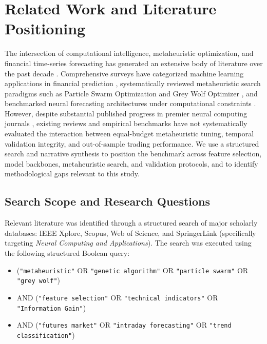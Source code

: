 
\section{Related Work and Literature Positioning}\label{sec:literature_review}

The intersection of computational intelligence, metaheuristic optimization, and financial time-series forecasting has generated an extensive body of literature over the past decade \cite{henrique2019stock_review, rajwar2023exhaustive_review, jiang2021applications}. Comprehensive surveys have categorized machine learning applications in financial prediction \cite{henrique2019stock_review, jiang2021applications}, systematically reviewed metaheuristic search paradigms such as Particle Swarm Optimization \cite{gad2022pso_comprehensive, wang2018pso_comprehensive} and Grey Wolf Optimizer \cite{faris2018gwo_review}, and benchmarked neural forecasting architectures under computational constraints \cite{dhingra2025solar, jovanovic2024wann}. However, despite substantial published progress in premier neural computing journals \cite{billah2024nca_moving_average, bandgar2025finchronos, al_bannoud2026accelerating, bashir2026evobagnet}, existing reviews and empirical benchmarks have not systematically evaluated the interaction between equal-budget metaheuristic tuning, temporal validation integrity, and out-of-sample trading performance. We use a structured search and narrative synthesis to position the benchmark across feature selection, model backbones, metaheuristic search, and validation protocols, and to identify methodological gaps relevant to this study.

\subsection{Search Scope and Research Questions}\label{subsec:selection_protocol}

Relevant literature was identified through a structured search of major scholarly databases: IEEE Xplore, Scopus, Web of Science, and SpringerLink (specifically targeting \textit{Neural Computing and Applications}). The search was executed using the following structured Boolean query:
\begin{itemize}
    \item (\texttt{"metaheuristic"} OR \texttt{"genetic algorithm"} OR \texttt{"particle swarm"} OR \texttt{"grey wolf"})
    \item AND (\texttt{"feature selection"} OR \texttt{"technical indicators"} OR \texttt{"Information Gain"})
    \item AND (\texttt{"futures market"} OR \texttt{"intraday forecasting"} OR \texttt{"trend classification"})
\end{itemize}

